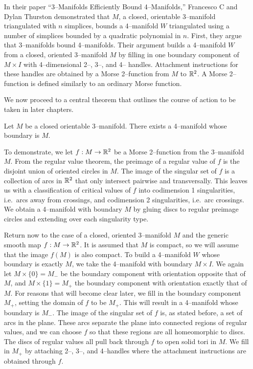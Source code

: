 \label{sec:3bound4}



In their paper ``3--Manifolds Efficiently Bound 4--Manifolds,'' Francesco C and Dylan Thurston demonstrated that $M$, a closed, orientable 3--manifold triangulated with $n$ simplices, bounds a 4--manifold $W$ triangulated using a number of simplices bounded by a quadratic polynomial in $n$.
First, they argue that 3--manifolds bound 4--manifolds.
Their argument builds a 4--manifold $W$ from a closed, oriented 3--manifold $M$ by filling in one boundary component of $M\times I$ with 4--dimensional 2--, 3--, and 4-- handles.
Attachment instructions for these handles are obtained by a Morse 2--function from $M$ to $\mathbb{R}^2$.
A Morse 2--function is defined similarly to an ordinary Morse function.




We now proceed to a central theorem that outlines the course of action to be taken in later chapters.

\begin{theorem}
	\label{thm:3bound4}
	Let $M$ be a closed orientable 3--manifold.
	There exists a 4--manifold whose boundary is $M$.
\end{theorem}


To demonstrate, we let $f:M\to\mathbb{R}^2$ be a Morse 2--function from the 3--manifold $M$.	
From the regular value theorem, the preimage of a regular value of $f$ is the disjoint union of oriented circles in $M$.	
The image of the singular set of $f$ is a collection of arcs in $\mathbb{R}^2$ that only intersect pairwise and transversally.
This leaves us with a classification of critical values of $f$ into codimension 1 singularities, i.e.\ arcs away from crossings, and codimension 2 singularities, i.e.\ arc crossings.
We obtain a 4--manifold with boundary $M$ by gluing discs to regular preimage circles and extending over each singularity type.
	

Return now to the case of a closed, oriented 3--manifold $M$ and the generic smooth map $f:M\to \mathbb{R}^2$.
It is assumed that $M$ is compact, so we will assume that the image $f(M)$ is also compact.
To build a 4--manifold $W$ whose boundary is exactly $M$, we take the 4--manifold with boundary $M\times I$.
We again let $M\times \{0\}=M_-$ be the boundary component with orientation opposite that of $M$, and $M\times\{1\}=M_+$ the boundary component with orientation exactly that of $M$.
For reasons that will become clear later, we fill in the boundary component $M_+$, setting the domain of $f$ to be $M_+$.
This will result in a 4--manifold whose boundary is $M_-$.
The image of the singular set of $f$ is, as stated before, a set of arcs in the plane.
These arcs separate the plane into connected regions of regular values, and we can choose $f$ so that these regions are all homeomorphic to discs.
The discs of regular values all pull back through $f$ to open solid tori in $M$.
We fill in $M_+$ by attaching 2--, 3--, and 4--handles where the attachment instructions are obtained through $f$.

